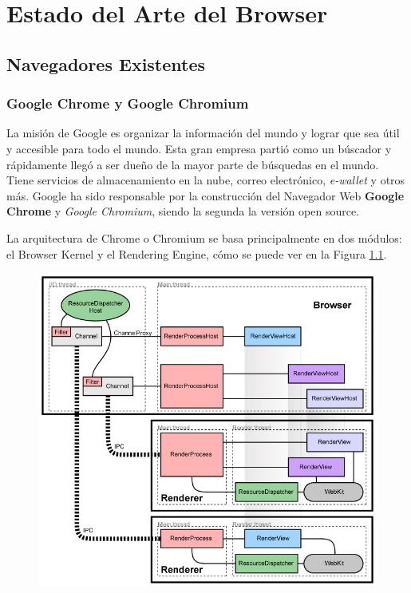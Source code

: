 \chapter{Estado del Arte del Browser} %
\label{chap3:EA}

\section{Navegadores Existentes}
\label{chap3:BrowExis}

    \subsection{Google Chrome y Google Chromium}
    \label{chap3:GC}
    La misión de Google es organizar la información del mundo y lograr que sea útil y accesible para todo el mundo. Esta gran empresa partió como un búscador y rápidamente llegó a ser dueño de la mayor parte de búsquedas en el mundo. Tiene servicios de almacenamiento en la nube, correo electrónico, \textit{e-wallet} y otros más. Google ha sido responsable por la construcción del Navegador Web \textbf{Google Chrome} y \textit{Google Chromium}, siendo la segunda la versión open source.

    La arquitectura de Chrome o Chromium se basa principalmente en dos módulos: el Browser Kernel y el Rendering Engine, cómo se puede ver en la Figura \ref{fig:archG}.

    \begin{figure}[h!t]
        \begin{center}
            \includegraphics[scale=0.5]{figures/archGC.jpg}
          \label{fig:archG}
        \end{center}
    \end{figure}

